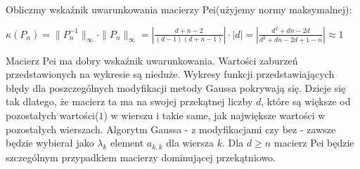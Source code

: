 \documentclass[a4paper,10pt]{article}
\begin{document}
            Obliczmy wskaźnik uwarunkowania macierzy Pei(użyjemy normy maksymalnej):
        \begin{center}
            $ \kappa(P_{n}) = \|P_{n}^{-1}\|_{\infty} \cdot \|P_{n}\|_{\infty} = |\frac{d+n-2}{(d-1)(d+n-1)}| \cdot |d| = |\frac{d^2+dn-2d}{d^2+dn-2d+1-n}| \approx 1 $
        \end{center}
            Macierz Pei ma dobry wskaźnik uwarunkowania. Wartości zaburzeń przedstawionych na wykresie są nieduże. Wykresy funkcji przedstawiających błędy dla poszczególnych modyfikacji metody Gaussa pokrywają się. Dzieje się tak dlatego, że macierz ta ma na swojej przekątnej liczby $d$, które są większe od pozostałych wartości($1$) w wierszu i takie same, jak największe wartości w pozostałych wierszach. Algorytm Gaussa - z modyfikacjami czy bez - zawsze będzie wybierał jako $\lambda_{k}$ element $a_{k,k}$ dla wiersza $k$.
            Dla $d \geq n$ macierz Pei będzie szczególnym przypadkiem macierzy dominującej przekątniowo.
\end{document}
